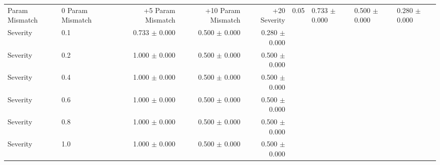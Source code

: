 \begin{table}[htbp]
\begin{tabular}{llrrr}
Param Mismatch & 0%
Param Mismatch & +5%
Param Mismatch & +10%
Param Mismatch & +20%
\midrule
Severity & 0.05 & 0.733 $\pm$ 0.000 & 0.500 $\pm$ 0.000 & 0.280 $\pm$ 0.000 \\
Severity & 0.1 & 0.733 $\pm$ 0.000 & 0.500 $\pm$ 0.000 & 0.280 $\pm$ 0.000 \\
Severity & 0.2 & 1.000 $\pm$ 0.000 & 0.500 $\pm$ 0.000 & 0.500 $\pm$ 0.000 \\
Severity & 0.4 & 1.000 $\pm$ 0.000 & 0.500 $\pm$ 0.000 & 0.500 $\pm$ 0.000 \\
Severity & 0.6 & 1.000 $\pm$ 0.000 & 0.500 $\pm$ 0.000 & 0.500 $\pm$ 0.000 \\
Severity & 0.8 & 1.000 $\pm$ 0.000 & 0.500 $\pm$ 0.000 & 0.500 $\pm$ 0.000 \\
Severity & 1.0 & 1.000 $\pm$ 0.000 & 0.500 $\pm$ 0.000 & 0.500 $\pm$ 0.000 \\
\bottomrule
\end{tabular}
\end{table}